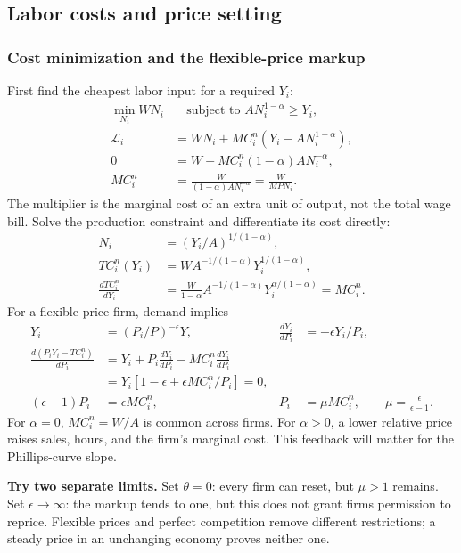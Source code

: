 \subsection{Labor costs and price setting}

\subsubsection{Cost minimization and the flexible-price markup}

First find the cheapest labor input for a required $Y_i$:
\begin{align}
 \min_{N_i}WN_i&\quad\text{subject to }AN_i^{1-\alpha}\geq Y_i,\\
 \mathcal L_i&=WN_i+MC_i^n(Y_i-AN_i^{1-\alpha}),\\
 0&=W-MC_i^n(1-\alpha)AN_i^{-\alpha},\\
 MC_i^n&=\frac{W}{(1-\alpha)AN_i^{-\alpha}}
        =\frac{W}{MPN_i}.\label{eq:nk-cost-foc}
\end{align}
The multiplier is the marginal cost of an extra unit of output, not the total
wage bill. Solve the production constraint and differentiate its cost directly:
\begin{align}
 N_i&=(Y_i/A)^{1/(1-\alpha)},\\
 TC_i^n(Y_i)&=WA^{-1/(1-\alpha)}Y_i^{1/(1-\alpha)},\\
 \frac{dTC_i^n}{dY_i}
 &=\frac{W}{1-\alpha}A^{-1/(1-\alpha)}Y_i^{\alpha/(1-\alpha)}=MC_i^n.
\end{align}
For a flexible-price firm, demand implies
\begin{align}
 Y_i&=(P_i/P)^{-\epsilon}Y,
 &\frac{dY_i}{dP_i}&=-\epsilon Y_i/P_i,\\
 \frac{d(P_iY_i-TC_i^n)}{dP_i}
 &=Y_i+P_i\frac{dY_i}{dP_i}-MC_i^n\frac{dY_i}{dP_i}\\
 &=Y_i[1-\epsilon+\epsilon MC_i^n/P_i]=0,\\
 (\epsilon-1)P_i&=\epsilon MC_i^n,
 &P_i&=\mu MC_i^n,\qquad\mu=\frac\epsilon{\epsilon-1}.
\end{align}
For $\alpha=0$, $MC_i^n=W/A$ is common across firms. For $\alpha>0$,
a lower relative price raises sales, hours, and the firm's marginal cost.
This feedback will matter for the Phillips-curve slope.

\begin{redblock}
\textbf{Try two separate limits.}
Set $\theta=0$: every firm can reset, but $\mu>1$ remains. Set
$\epsilon\to\infty$: the markup tends to one, but this does not grant firms
permission to reprice. Flexible prices and perfect competition remove different
restrictions; a steady price in an unchanging economy proves neither one.
\end{redblock}

